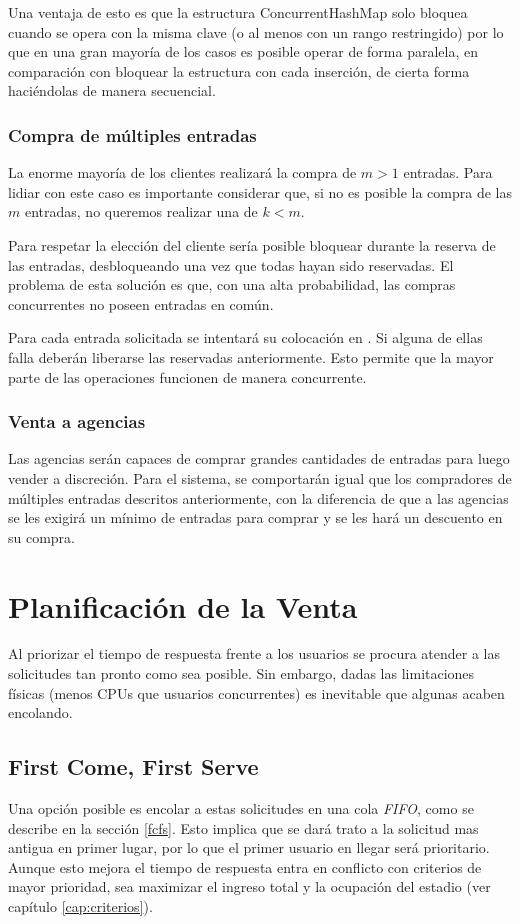 Una ventaja de esto es que la estructura ConcurrentHashMap solo bloquea cuando
se opera con la misma clave (o al menos con un rango restringido) por lo que en
una gran mayoría de los casos es posible operar de forma paralela, en
comparación con bloquear la estructura con cada inserción, de cierta forma
haciéndolas de manera secuencial.

\subsubsection{Compra de múltiples entradas}
La enorme mayoría de los clientes realizará la compra de \(m > 1\) entradas.
Para lidiar con este caso es importante considerar que,
si no es posible la compra de las \(m\) entradas,
no queremos realizar una de \(k < m\).

Para respetar la elección del cliente sería posible bloquear durante la reserva de las entradas,
desbloqueando una vez que todas hayan sido reservadas.
El problema de esta solución es que, con una alta probabilidad, las compras concurrentes no poseen entradas
en común.

Para cada entrada solicitada se intentará su colocación en .
Si alguna de ellas falla deberán liberarse las reservadas anteriormente.
Esto permite que la mayor parte de las operaciones funcionen de manera concurrente.

\subsubsection{Venta a agencias}\label{venta-agencia}
Las agencias serán capaces de comprar grandes cantidades de entradas para luego vender a discreción.
Para el sistema, se comportarán igual que los compradores de múltiples entradas descritos anteriormente,
con la diferencia de que a las agencias se les exigirá un mínimo de entradas para comprar y se les hará un descuento
en su compra.

\section{Planificación de la Venta}
Al priorizar el tiempo de respuesta frente a los usuarios se procura atender a las solicitudes tan pronto como sea posible.
Sin embargo, dadas las limitaciones físicas (menos CPUs que usuarios concurrentes) es inevitable que algunas acaben encolando.

\subsection{First Come, First Serve}
Una opción posible es encolar a estas solicitudes en una cola \emph{FIFO}, como se describe en la sección \ref{fcfs}.
Esto implica que se dará trato a la solicitud mas antigua en primer lugar, por lo que el primer usuario en llegar será prioritario.
Aunque esto mejora el tiempo de respuesta entra en conflicto con criterios de mayor prioridad,
sea maximizar el ingreso total y la ocupación del estadio (ver capítulo \ref{cap:criterios}).

